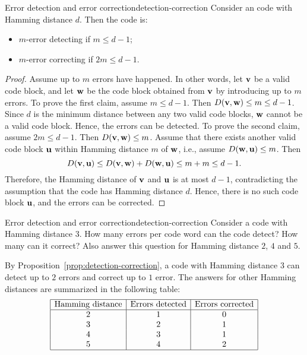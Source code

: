 \begin{proposition}{Error detection and error correction}{detection-correction}
  Consider an code with Hamming distance $d$. Then the code is:
  \begin{itemize}
  \item $m$-error detecting if $m\leq d-1$;
  \item $m$-error correcting if $2m\leq d-1$. 
  \end{itemize}
\end{proposition}

\begin{proof}
  Assume up to $m$ errors have happened. In other words, let
  $\mbox{\bf v}$ be a valid code block, and let $\mbox{\bf w}$ be the code
  block obtained from $\mbox{\bf v}$ by introducing up to $m$ errors.  To
  prove the first claim, assume $m\leq d-1$.  Then
  $D(\mbox{\bf v},\mbox{\bf w})\leq m\leq d-1$. Since $d$ is the minimum
  distance between any two valid code blocks, $\mbox{\bf w}$ cannot be a
  valid code block. Hence, the errors can be detected.  To prove the
  second claim, assume $2m\leq d-1$. Then
  $D(\mbox{\bf v},\mbox{\bf w})\leq m$. Assume that there exists another
  valid code block $\mbox{\bf u}$ within Hamming distance $m$ of
  $\mbox{\bf w}$, i.e., assume $D(\mbox{\bf w},\mbox{\bf u})\leq m$. Then
  \begin{equation*}
    D(\mbox{\bf v},\mbox{\bf u}) \leq D(\mbox{\bf v},\mbox{\bf w}) +
    D(\mbox{\bf w},\mbox{\bf u}) \leq m+m \leq d-1.
  \end{equation*}
  Therefore, the Hamming distance of $\mbox{\bf v}$ and $\mbox{\bf u}$ is at
  most $d-1$, contradicting the assumption that the code has Hamming
  distance $d$. Hence, there is no such code block $\mbox{\bf u}$, and the
  errors can be corrected.
\end{proof}

\begin{example}{Error detection and error correction}{detection-correction}
  Consider a code with Hamming distance $3$. How many errors per code
  word can the code detect? How many can it correct? Also answer this
  question for Hamming distance $2$, $4$ and $5$.
\end{example}

\begin{solution}
  By Proposition~\ref{prop:detection-correction}, a code with Hamming
  distance $3$ can detect up to $2$ errors and correct up to $1$
  error. The answers for other Hamming distances are summarized in the
  following table:
  \begin{equation*}
    \begin{array}{|c|c|c|}
      \hline
      \mbox{Hamming distance} & \mbox{Errors detected} & \mbox{Errors corrected} \\\hline
      2 & 1 & 0 \\
      3 & 2 & 1 \\
      4 & 3 & 1 \\
      5 & 4 & 2 \\
      \hline
    \end{array}
  \end{equation*}
\end{solution}

